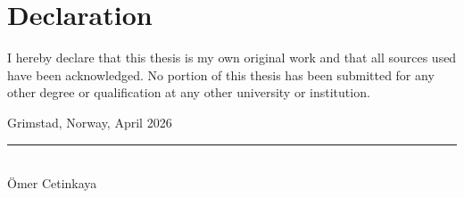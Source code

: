 \chapter*{Declaration}

I hereby declare that this thesis is my own original work and that all sources
used have been acknowledged.  No portion of this thesis has been submitted for
any other degree or qualification at any other university or institution.

\vspace{3cm}

\noindent
Grimstad, Norway, April 2026

\vspace{2cm}

\noindent\rule{7cm}{0.4pt}\\
Ömer Cetinkaya
